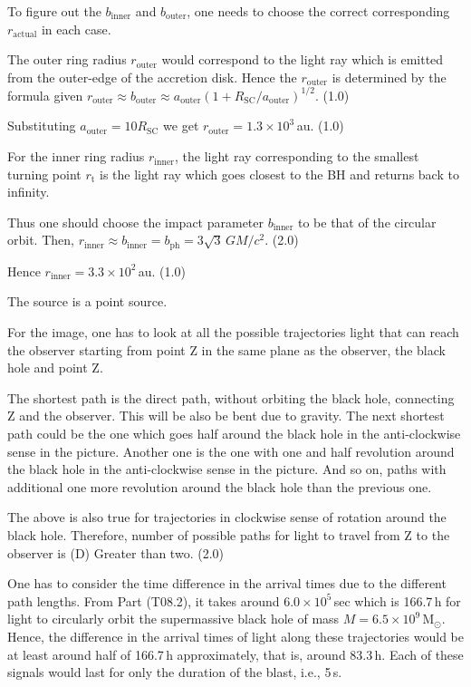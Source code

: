 \begin{description}
  To figure out the $b_{\mathrm{inner}}$ and $b_{\mathrm{outer}}$, one needs to
  choose the correct corresponding $r_{\mathrm{actual}}$ in each case.

  The outer ring radius $r_{\mathrm{outer}}$ would correspond to the light ray
  which is emitted from the outer-edge of the accretion disk. Hence the
  $r_{\mathrm{outer}}$ is determined by the formula given
  $r_{\mathrm{outer}} \approx b_{\mathrm{outer}} \approx a_{\mathrm{outer}}
  \left(1 + R_{\mathrm{SC}}/a_{\mathrm{outer}}\right)^{1/2}$. \hfill(1.0)

  Substituting $a_{\mathrm{outer}} = 10 R_{\mathrm{SC}}$ we get
  $r_{\mathrm{outer}} = 1.3 \times 10^{3}$\,au. \hfill(1.0)

  For the inner ring radius $r_{\mathrm{inner}}$, the light ray corresponding
  to the smallest turning point $r_{\mathrm{t}}$ is the light ray which goes
  closest to the BH and returns back to infinity.

  Thus one should choose the impact parameter $b_{\mathrm{inner}}$ to be that
  of the circular orbit. Then,
  $r_{\mathrm{inner}} \approx b_{\mathrm{inner}} = b_{\mathrm{ph}}
  = 3\sqrt{3}\,GM/c^2$. \hfill(2.0)

  Hence $r_{\mathrm{inner}} = 3.3 \times 10^{2}$\,au. \hfill(1.0)

\item[(T08.5a)] The source is a point source.

  For the image, one has to look at all the possible trajectories light that
  can reach the observer starting from point Z in the same plane as the
  observer, the black hole and point Z.

  The shortest path is the direct path, without orbiting the black hole,
  connecting Z and the observer. This will be also be bent due to
  gravity. %
  The
  next shortest path could be the one which goes half around the black hole in
  the anti-clockwise sense in the picture. Another one is the one with one and
  half revolution around the black hole in the anti-clockwise sense in the
  picture. And so on, paths with additional one more revolution around the
  black hole than the previous one.

  The above is also true for trajectories in clockwise sense of rotation
  around the black hole. Therefore, number of possible paths for light to
  travel from Z to the observer is (D) Greater than two. \hfill(2.0)

\item[(T08.5b)] One has to consider the time difference in the arrival times
  due to the different path lengths. From Part (T08.2), it takes around
  $6.0 \times 10^{5}$\,sec which is 166.7\,h for light to circularly orbit the
  supermassive black hole of mass $M = 6.5 \times 10^{9}\,\mathrm{M_\odot}$.
  Hence, the difference in the arrival times of light along these trajectories
  would be at least around half of 166.7\,h approximately, that is, around
  83.3\,h. Each of these signals would last for only the duration of the
  blast, i.e., 5\,s.


\end{description}
